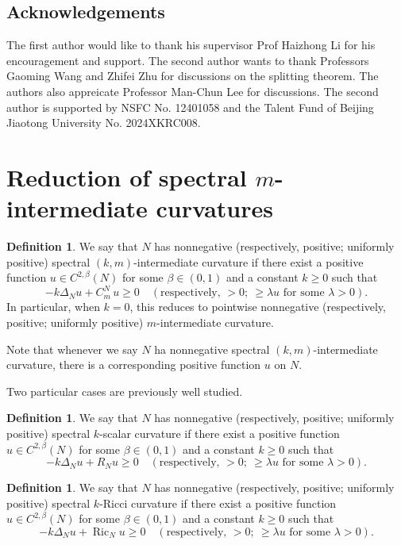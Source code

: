 \documentclass[11pt,letterpaper]{amsart}
\DeclareMathOperator{\Ric}{Ric}
\theoremstyle{definition}
\newtheorem{definition}[theorem]{Definition}
\theoremstyle{remark}
\numberwithin{equation}{section}
\begin{document}
\subsection{Acknowledgements}
 The first author would like to thank his supervisor Prof Haizhong Li for his encouragement and support. The second author wants to thank Professors Gaoming Wang and Zhifei Zhu for discussions on the splitting theorem. The authors also appreicate Professor Man-Chun Lee for discussions. The second author is supported by NSFC No. 12401058 and the Talent
Fund of Beijing Jiaotong University No. 2024XKRC008. 






\section{Reduction of spectral $m$-intermediate curvatures}\label{section2}




\begin{definition}
We say that $N$ has nonnegative (respectively, positive; uniformly positive) spectral $(k,m)$-intermediate curvature if there exist a positive function $u \in C^{2,\beta}(N)$ for some $\beta \in (0,1)$ and a constant $k \geq 0$ such that
\[
 -k \Delta_N u + C^N_m\, u \geq 0 
 \quad (\text{respectively, } > 0;\ \geq \lambda u \text{ for some } \lambda > 0).
\]
In particular, when $k = 0$, this reduces to pointwise nonnegative (respectively, positive; uniformly positive) $m$-intermediate curvature.
\end{definition}

Note that whenever we say $N$ ha nonnegative spectral $(k,m)$-intermediate curvature, there is a corresponding positive function $u$ on $N$.

Two particular cases are previously well studied.
\begin{definition}
    We say that $N$ has nonnegative (respectively, positive; uniformly positive) spectral $k$-scalar curvature if there exist a positive function $u \in C^{2,\beta}(N)$ for some $\beta \in (0,1)$ and a constant $k \geq 0$ such that
    \[-k \Delta_N u+R_N u \geq 0 \quad (\text{respectively, } > 0; \ \geq \lambda u \text{ for some } \lambda > 0).\]
\end{definition}

\begin{definition}
    We say  that $N$ has nonnegative (respectively, positive; uniformly positive) spectral $k$-Ricci curvature if there exist a positive function $u \in C^{2,\beta}(N)$ for some $\beta \in (0,1)$ and a constant $k \geq 0$ such that
    \[-k \Delta_N u+\Ric_N u \geq 0 \quad (\text{respectively, } > 0;\ \geq \lambda u \text{ for some } \lambda > 0).\]
\end{definition}
\end{document}
